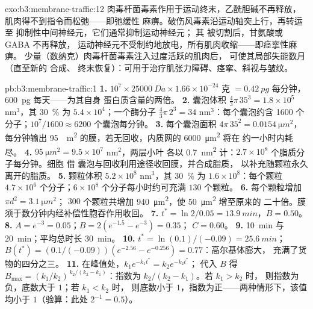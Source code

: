 \begin{solution}{exo:b3:membrane-traffic:12}
肉毒杆菌毒素作用于运动终末，乙酰胆碱不再释放，
肌肉得不到指令而松弛——即弛缓性
麻痹。破伤风毒素沿运动轴突上行，再转运至
抑制性中间神经元，它们通常抑制运动神经元；
其  被切割后，甘氨酸或 GABA 不再释放，
运动神经元不受制约地放电，所有肌肉收缩——即痉挛性麻痹。
少量（数纳克）肉毒杆菌毒素注入过度活跃的肌肉后，
可使其局部失能数月（直至新的  合成、
终末恢复）：可用于治疗肌张力障碍、痉挛、斜视与皱纹。
\end{solution}

\begin{solution}{pb:b3:membrane-traffic:1}
\textbf{1.} $10^{7}\times \qty{25000}{Da}\times 1.66\times 10^{-24}$ 克
$= \qty{0.42}{pg}$ 每分钟，\qty{600}{pg} 每天——为其自身
蛋白质含量的两倍。
\textbf{2.} 囊泡体积 $\tfrac{4}{3}\pi\,35^{3} = 1.8\times 10^{5}$
nm$^{3}$，其 \qty{30}{\%} 为 $5.4\times 10^{4}$；一个酶分子
$\tfrac{4}{3}\pi\,2^{3} = 34$ nm$^{3}$：每个囊泡约含 \num{1600} 个
分子；$10^{7}/1600 \approx 6200$ 个囊泡每分钟。
\textbf{3.} 每个囊泡面积 $4\pi\,35^{2} = \qty{0.0154}{\micro m^2}$，每分钟输出 \qty{95}{\micro
m^2} 的膜，若无回收，内质网的 \qty{6000}{\micro m^2} 将在
约一小时内耗尽。
\textbf{4.} $\qty{95}{\micro m^2} = 9.5\times 10^{7}$ nm$^{2}$，两层小叶
各以 \qty{0.7}{nm^2} 计：$2.7\times 10^{8}$ 个脂质分子每分钟。细胞
借  囊泡与回收利用途径收回膜，并合成脂质，
以补充随颗粒永久离开的脂质。
\textbf{5.} 颗粒体积 $5.2\times 10^{8}$ nm$^{3}$，其 \qty{30}{\%} 为
$1.6\times 10^{8}$：每个颗粒 $4.7\times 10^{6}$ 个分子；$6\times
10^{8}$ 个分子每小时约可充满 $130$ 个颗粒。
\textbf{6.} 每个颗粒增加 $\pi d^{2} = \qty{3.1}{\micro m^2}$；
$300$ 个颗粒共增加 \qty{940}{\micro m^2}，使 \qty{50}{\micro m^2} 增至原来的
二十倍。膜须于数分钟内经补偿性胞吞作用收回。
\textbf{7.} $t^{*} = \ln 2/0.05 = \qty{13.9}{min}$，$B = 0.50$。
\textbf{8.} $A = e^{-3} = 0.05$；$B = 2(e^{-1.5} - e^{-3}) = 0.35$；
$C = 0.60$。
\textbf{9.} \qty{10}{min} 与 \qty{20}{min}；平均总时长 \qty{30}{min}。
\textbf{10.} $t^{*} = \ln(0.1)/(-0.09) = \qty{25.6}{min}$；$B(t^{*}) =
(0.1/(-0.09))(e^{-2.56} - e^{-0.256}) = 0.77$：高尔基体膨大，
充满了货物的四分之三。
\textbf{11.} 在峰值处，$k_{1}e^{-k_{1}t^{*}} = k_{2}e^{-k_{2}t^{*}}$；
代入 $B$ 得 $B_{\max} = (k_{1}/k_{2})^{\,k_{2}/(k_{2} -
k_{1})}$：指数为 $k_{2}/(k_{2} - k_{1})$。若 $k_{1} > k_{2}$ 时，
则指数为负，底数大于 $1$；若 $k_{1} < k_{2}$ 时，
则底数小于 $1$，指数为正——两种情形下，该值
均小于 $1$（验算：此处 $2^{-1} = 0.5$）。

\end{solution}
